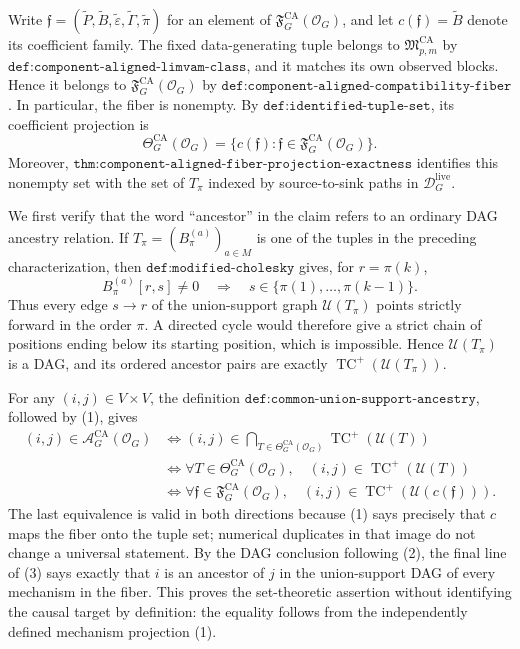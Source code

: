 Write \(\mathfrak f=(\widetilde P,\widetilde B,
\widetilde\varepsilon,\widetilde\Gamma,\widetilde\pi)\) for an element of
\(\mathfrak F_G^{\mathrm{CA}}(\mathcal O_G)\), and let
\(c(\mathfrak f)=\widetilde B\) denote its coefficient family.  The fixed
data-generating tuple belongs to \(\mathfrak M_{p,m}^{\mathrm{CA}}\) by
\(\texttt{def:component-aligned-limvam-class}\), and it matches its own
observed blocks.  Hence it belongs to
\(\mathfrak F_G^{\mathrm{CA}}(\mathcal O_G)\) by
\(\texttt{def:component-aligned-compatibility-fiber}\).  In particular, the
fiber is nonempty.  By \(\texttt{def:identified-tuple-set}\), its coefficient
projection is
\[
 \Theta_G^{\mathrm{CA}}(\mathcal O_G)
 =\{c(\mathfrak f):
       \mathfrak f\in\mathfrak F_G^{\mathrm{CA}}(\mathcal O_G)\}.
 \tag{1}
\]
Moreover, \(\texttt{thm:component-aligned-fiber-projection-exactness}\)
identifies this nonempty set with the set of \(T_\pi\) indexed by
source-to-sink paths in \(\mathcal D_G^{\mathrm{live}}\).

We first verify that the word ``ancestor'' in the claim refers to an ordinary
DAG ancestry relation.  If \(T_\pi=(B_\pi^{(a)})_{a\in M}\) is one of the
tuples in the preceding characterization, then
\(\texttt{def:modified-cholesky}\) gives, for
\(r=\pi(k)\),
\[
 B_\pi^{(a)}[r,s]\ne0
 \quad\Longrightarrow\quad
 s\in\{\pi(1),\ldots,\pi(k-1)\}.
 \tag{2}
\]
Thus every edge \(s\to r\) of the union-support graph
\(\mathcal U(T_\pi)\) points strictly forward in the order \(\pi\).  A
directed cycle would therefore give a strict chain of positions ending below
its starting position, which is impossible.  Hence
\(\mathcal U(T_\pi)\) is a DAG, and its ordered ancestor pairs are exactly
\(\operatorname{TC}^{+}(\mathcal U(T_\pi))\).

For any \((i,j)\in V\times V\), the definition
\(\texttt{def:common-union-support-ancestry}\), followed by (1), gives
\[
\begin{aligned}
 (i,j)\in\mathcal A_G^{\mathrm{CA}}(\mathcal O_G)
 &\Longleftrightarrow
   (i,j)\in
   \bigcap_{T\in\Theta_G^{\mathrm{CA}}(\mathcal O_G)}
        \operatorname{TC}^{+}(\mathcal U(T))                                      \\
 &\Longleftrightarrow
   \forall T\in\Theta_G^{\mathrm{CA}}(\mathcal O_G),\quad
   (i,j)\in\operatorname{TC}^{+}(\mathcal U(T))                                  \\
 &\Longleftrightarrow
   \forall\mathfrak f\in\mathfrak F_G^{\mathrm{CA}}(\mathcal O_G),\quad
   (i,j)\in
   \operatorname{TC}^{+}(\mathcal U(c(\mathfrak f))).
 \tag{3}
\end{aligned}
\]
The last equivalence is valid in both directions because (1) says precisely
that \(c\) maps the fiber onto the tuple set; numerical duplicates in that
image do not change a universal statement.  By the DAG conclusion following
(2), the final line of (3) says exactly that \(i\) is an ancestor of \(j\) in
the union-support DAG of every mechanism in the fiber.  This proves the
set-theoretic assertion without identifying the causal target by definition:
the equality follows from the independently defined mechanism projection (1).

